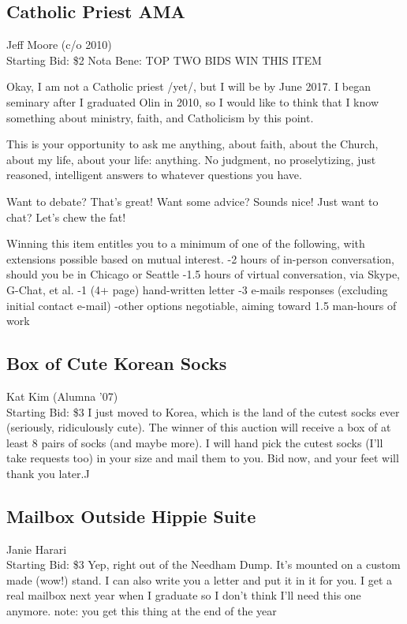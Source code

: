 \documentclass[11pt]{article}
\begin{document}
\subsection{Catholic Priest AMA}
Jeff Moore (c/o 2010)
\\
Starting Bid: \$2
\newline
Nota Bene: TOP TWO BIDS WIN THIS ITEM

Okay, I am not a Catholic priest /yet/, but I will be by June 2017. I began seminary after I graduated Olin in 2010, so I would like to think that I know something about ministry, faith, and Catholicism by this point.

This is your opportunity to ask me anything, about faith, about the Church, about my life, about your life: anything. No judgment, no proselytizing, just reasoned, intelligent answers to whatever questions you have.

Want to debate? That's great! Want some advice? Sounds nice! Just want to chat? Let's chew the fat!

Winning this item entitles you to a minimum of one of the following, with extensions possible based on mutual interest.
-2 hours of in-person conversation, should you be in Chicago or Seattle
-1.5 hours of virtual conversation, via Skype, G-Chat, et al.
-1 (4+ page) hand-written letter
-3 e-mails responses (excluding initial contact e-mail)
-other options negotiable, aiming toward 1.5 man-hours of work
\subsection{Box of Cute Korean Socks}
Kat Kim (Alumna '07)
\\
Starting Bid: \$3
\newline
I just moved to Korea, which is the land of the cutest socks ever (seriously, ridiculously cute). The winner of this auction will receive a box of at least 8 pairs of socks (and maybe more). I will hand pick the cutest socks (I'll take requests too) in your size and mail them to you. Bid now, and your feet will thank you later.^^
\subsection{Mailbox Outside Hippie Suite}
Janie Harari
\\
Starting Bid: \$3
\newline
Yep, right out of the Needham Dump.  It's mounted on a custom made (wow!) stand.  I can also write you a letter and put it in it for you.  I get a real mailbox next year when I graduate so I don't think I'll need this one anymore. note: you get this thing at the end of the year
\end{document}
